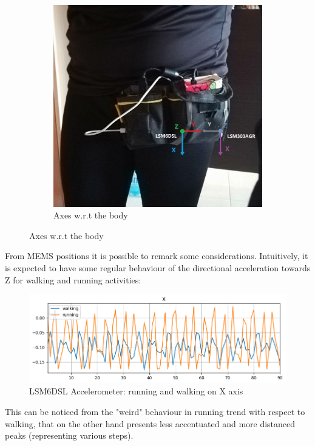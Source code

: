 \begin{center}
\begin{figure}[H]
\begin{subfigure}[H]{0.45\textwidth}
			\includegraphics[scale=0.45]{figures/sensor_orientation.jpg}
			\caption{Axes w.r.t the body}\label{fig:7b}
		\end{subfigure}
	\end{figure} 
\end{center}
From MEMS positions it is possible to remark some considerations. Intuitively, it is expected to have some regular behaviour of the directional acceleration towards Z for walking and running activities:
\begin{figure}[H]
		\hfill\includegraphics[scale=0.8]{figures/plot_ACC_LSM6DSL_DS_walking_running_X.png}\hspace*{\fill}
		\caption{LSM6DSL Accelerometer: running and walking on X axis}\label{fig:8}
		\centering
\end{figure}
This can be noticed from the "weird" behaviour in running trend with respect to walking, that on the other hand presents less accentuated and more distanced peaks (representing various steps).\newline
